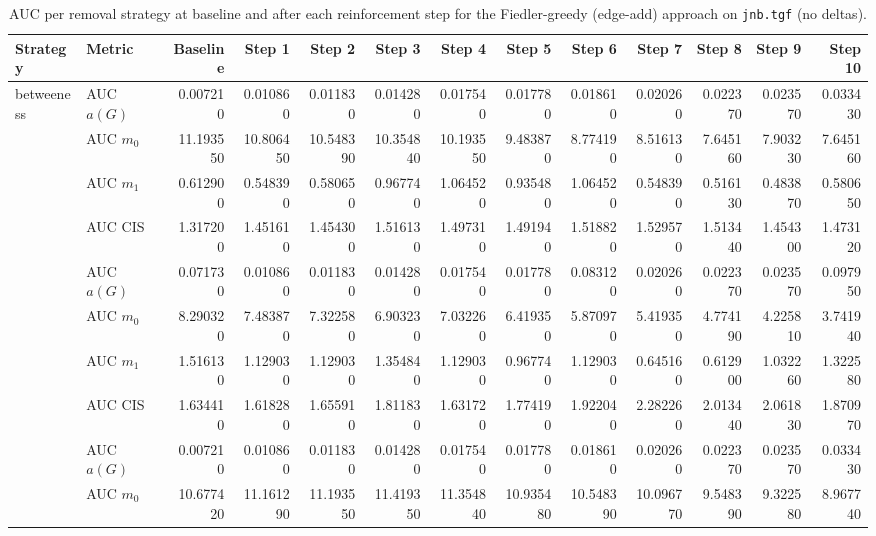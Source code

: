 \begin{table}[htbp]
  \centering
  \caption{AUC per removal strategy at baseline and after each reinforcement step for the Fiedler-greedy (edge-add) approach on \texttt{jnb.tgf} (no deltas).}
  \label{tab:jnb-fiedler_greedy-auc}
\setlength{\tabcolsep}{2.5pt}
  \begin{tabular}{llrrrrrrrrrrr}
    \toprule
    \textbf{Strategy} & \textbf{Metric} & \textbf{Baseline} & \textbf{Step 1} & \textbf{Step 2} & \textbf{Step 3} & \textbf{Step 4} & \textbf{Step 5} & \textbf{Step 6} & \textbf{Step 7} & \textbf{Step 8} & \textbf{Step 9} & \textbf{Step 10} \\
    \midrule
    \multirow{4}{*}{betweeness} & AUC $a(G)$ & 0.007210 & 0.010860 & 0.011830 & 0.014280 & 0.017540 & 0.017780 & 0.018610 & 0.020260 & 0.022370 & 0.023570 & 0.033430 \\
    & AUC $m_0$ & 11.193550 & 10.806450 & 10.548390 & 10.354840 & 10.193550 & 9.483870 & 8.774190 & 8.516130 & 7.645160 & 7.903230 & 7.645160 \\
    & AUC $m_1$ & 0.612900 & 0.548390 & 0.580650 & 0.967740 & 1.064520 & 0.935480 & 1.064520 & 0.548390 & 0.516130 & 0.483870 & 0.580650 \\
    & AUC CIS & 1.317200 & 1.451610 & 1.454300 & 1.516130 & 1.497310 & 1.491940 & 1.518820 & 1.529570 & 1.513440 & 1.454300 & 1.473120 \\
    \addlinespace
    \multirow{4}{*}{closeness} & AUC $a(G)$ & 0.071730 & 0.010860 & 0.011830 & 0.014280 & 0.017540 & 0.017780 & 0.083120 & 0.020260 & 0.022370 & 0.023570 & 0.097950 \\
    & AUC $m_0$ & 8.290320 & 7.483870 & 7.322580 & 6.903230 & 7.032260 & 6.419350 & 5.870970 & 5.419350 & 4.774190 & 4.225810 & 3.741940 \\
    & AUC $m_1$ & 1.516130 & 1.129030 & 1.129030 & 1.354840 & 1.129030 & 0.967740 & 1.129030 & 0.645160 & 0.612900 & 1.032260 & 1.322580 \\
    & AUC CIS & 1.634410 & 1.618280 & 1.655910 & 1.811830 & 1.631720 & 1.774190 & 1.922040 & 2.282260 & 2.013440 & 2.061830 & 1.870970 \\
    \addlinespace
    \multirow{4}{*}{core influence} & AUC $a(G)$ & 0.007210 & 0.010860 & 0.011830 & 0.014280 & 0.017540 & 0.017780 & 0.018610 & 0.020260 & 0.022370 & 0.023570 & 0.033430 \\
    & AUC $m_0$ & 10.677420 & 11.161290 & 11.193550 & 11.419350 & 11.354840 & 10.935480 & 10.548390 & 10.096770 & 9.548390 & 9.322580 & 8.967740 \\

\end{tabular}
\end{table}
